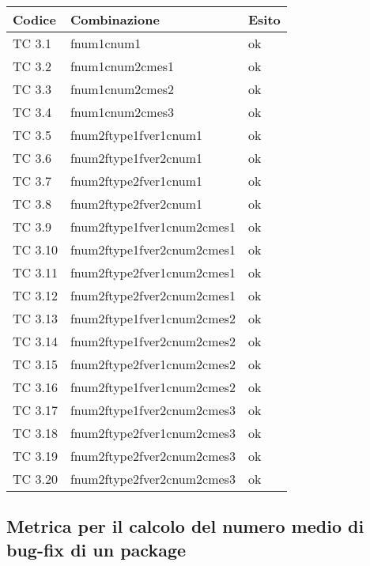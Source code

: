 \begin{tabular}{|p{3cm}|p{7cm}|p{3cm}|}
	\hline
	\rowcolor{Gray}
	\textbf{Codice} & \textbf{Combinazione} & \textbf{Esito}\tabularnewline
	\hline
	TC 3.1 			& fnum1cnum1 					& ok \tabularnewline
	\hline
	TC 3.2 			& fnum1cnum2cmes1 				& ok \tabularnewline
	\hline
	TC 3.3 			& fnum1cnum2cmes2 				& ok \tabularnewline
	\hline
	TC 3.4 			& fnum1cnum2cmes3 				& ok \tabularnewline
	\hline
	TC 3.5 			& fnum2ftype1fver1cnum1 			& ok \tabularnewline
	\hline
	TC 3.6 			& fnum2ftype1fver2cnum1				& ok \tabularnewline
	\hline
	TC 3.7 			& fnum2ftype2fver1cnum1 			& ok \tabularnewline
	\hline
	TC 3.8 			& fnum2ftype2fver2cnum1 			& ok \tabularnewline
	\hline
	TC 3.9 			& fnum2ftype1fver1cnum2cmes1 			& ok \tabularnewline
	\hline
	TC 3.10 		& fnum2ftype1fver2cnum2cmes1 			& ok \tabularnewline
	\hline
	TC 3.11 		& fnum2ftype2fver1cnum2cmes1 			& ok \tabularnewline
	\hline
	TC 3.12			& fnum2ftype2fver2cnum2cmes1 			& ok \tabularnewline
	\hline
	TC 3.13			& fnum2ftype1fver1cnum2cmes2 			& ok \tabularnewline
	\hline
	TC 3.14			& fnum2ftype1fver2cnum2cmes2 			& ok \tabularnewline
	\hline
	TC 3.15			& fnum2ftype2fver1cnum2cmes2 			& ok \tabularnewline
	\hline
	TC 3.16			& fnum2ftype1fver1cnum2cmes2 			& ok \tabularnewline
	\hline
	TC 3.17			& fnum2ftype1fver2cnum2cmes3 			& ok \tabularnewline
	\hline
	TC 3.18			& fnum2ftype2fver1cnum2cmes3 			& ok \tabularnewline
	\hline
	TC 3.19			& fnum2ftype2fver2cnum2cmes3 			& ok \tabularnewline
	\hline
	TC 3.20			& fnum2ftype2fver2cnum2cmes3 			& ok \tabularnewline
	\hline
\end{tabular}
\clearpage




\subsection{Metrica per il calcolo del numero medio di bug-fix di un package}

